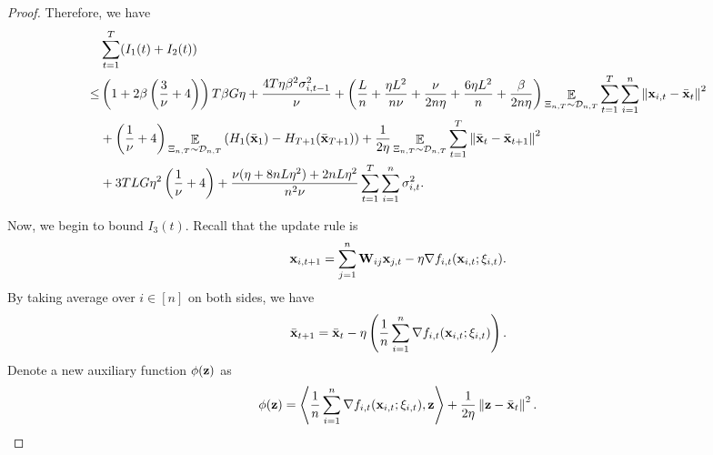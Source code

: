 \documentclass{article}
\begin{document}
\begin{proof}
Therefore, we have 
\begin{align}
\nonumber
&\sum_{t=1}^T (I_1(t) + I_2(t)) \\ \nonumber
\le & \left( 1 + 2\beta\left( \frac{3}{\nu}+4 \right) \right)T\beta G \eta + \frac{4T\eta \beta^2 \sigma_{i,t-1}^2}{\nu} + \left(  \frac{L}{n} + \frac{\eta L^2}{n\nu} + \frac{\nu}{2n\eta} + \frac{6\eta L^2}{n}  + \frac{\beta}{2n\eta}  \right)\mathop{\mathbb{E}}_{ \Xi_{n,T} \sim \mathcal{D}_{n,T} }\sum_{t=1}^T\sum_{i=1}^n\left\lVert{\bf x}_{i,t} - \bar{{\bf x}}_t \right\rVert^2 \\ \nonumber 
&+ \left( \frac{1}{\nu} + 4 \right)\mathop{\mathbb{E}}_{ \Xi_{n,T} \sim \mathcal{D}_{n,T} }\left( H_1(\bar{{\bf x}}_1) - H_{T+1}(\bar{{\bf x}}_{T+1}) \right) + \frac{1}{2\eta}\mathop{\mathbb{E}}_{ \Xi_{n,T} \sim \mathcal{D}_{n,T} }\sum_{t=1}^T\left\lVert \bar{{\bf x}}_t - \bar{{\bf x}}_{t+1}\right\rVert^2 \\ \nonumber 
& + 3TLG\eta^2\left(  \frac{1}{\nu} + 4  \right) + \frac{\nu(\eta + 8nL\eta^2) + 2nL\eta^2}{n^2\nu} \sum_{t=1}^T\sum_{i=1}^n\sigma_{i,t}^2.
\end{align}






Now, we begin to bound $I_3(t)$. Recall that the update rule is 
\begin{align}
\nonumber
{\bf x}_{i,t+1} = \sum_{j=1}^n {\bf W}_{ij}{\bf x}_{j,t} - \eta \nabla f_{i,t}({\bf x}_{i,t};\xi_{i,t}).
\end{align} By taking average over $i\in[n]$ on both sides, we have 
\begin{align}
\label{equa_thoerem_update_rule_equivalent}
\bar{{\bf x}}_{t+1} = \bar{{\bf x}}_t - \eta \left( \frac{1}{n}\sum_{i=1}^n \nabla f_{i,t}({\bf x}_{i,t};\xi_{i,t}) \right).
\end{align} 
Denote a new auxiliary function $\phi({\bf z})$ as 
\begin{align}
\nonumber
\phi({\bf z}) = \left\langle\frac{1}{n}\sum_{i=1}^n \nabla f_{i,t}({\bf x}_{i,t};\xi_{i,t}), {\bf z} \right\rangle + \frac{1}{2\eta}\left\lVert{\bf z} - \bar{{\bf x}}_t\right\rVert^2.
\end{align} 


\end{proof}
\end{document}
